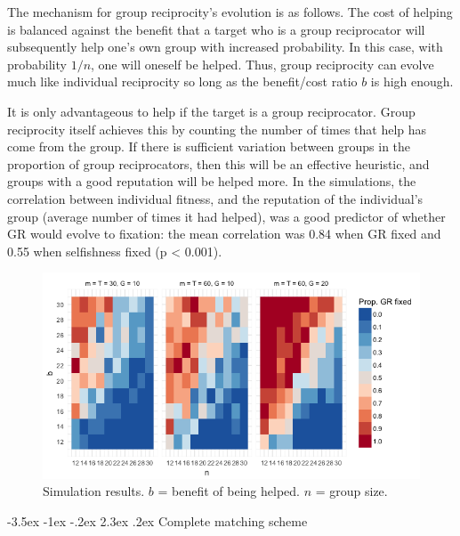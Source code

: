 \documentclass[12pt,a4paper]{article}\usepackage[]{graphicx}\usepackage[]{color}
\makeatletter
\renewcommand\section{\@startsection {section}{1}{\z@}%
{-3.5ex \@plus -1ex \@minus -.2ex}%
{2.3ex \@plus.2ex}%
{\bf\sffamily\Large}}
\makeatother
\begin{document}
The mechanism for group reciprocity's evolution is as follows. The cost of helping is balanced against the benefit
that a target who is a group reciprocator will subsequently help one's own group with increased probability. In this
case, with probability $1/n$, one will oneself be helped. Thus, group reciprocity can evolve much like individual
reciprocity so long as the benefit/cost ratio $b$ is high enough. 


It is only advantageous to help if the target is a group reciprocator. Group reciprocity itself achieves this by
counting the number of times that help has come from the group. If there is sufficient variation between groups in the
proportion of group reciprocators, then this will be an effective heuristic, and groups with a good reputation will be
helped more. In the simulations, the correlation between
individual fitness, and the reputation of the individual's group (average number of times it had helped), was a good
predictor of whether GR would evolve to fixation: the mean correlation was 0.84 when GR fixed and 0.55 when selfishness fixed (p < 0.001).


\begin{figure}
	\begin{center}
		  \includegraphics[width=\textwidth]{b-vs-gsize-all-sims.png}
        \caption{Simulation results. $b$ = benefit of being helped. $n$ = group size.}
        \label{fig:simulations}
	\end{center}
\end{figure}


\section{Complete matching scheme}
\begin{center}
\begin{sideways}\resizebox{0.9\textheight}{!}{



}
\end{sideways}
\end{center}
\end{document}
